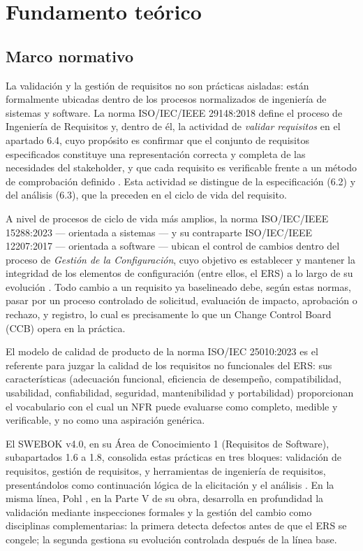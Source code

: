 \documentclass[11pt,a4paper]{article}
\begin{document}
\section{Fundamento teórico}
 
\subsection{Marco normativo}
La validación y la gestión de requisitos no son prácticas aisladas: están
formalmente ubicadas dentro de los procesos normalizados de ingeniería de
sistemas y software. La norma ISO/IEC/IEEE 29148:2018 define el proceso de
Ingeniería de Requisitos y, dentro de él, la actividad de \emph{validar
requisitos} en el apartado 6.4, cuyo propósito es confirmar que el conjunto
de requisitos especificados constituye una representación correcta y
completa de las necesidades del stakeholder, y que cada requisito es
verificable frente a un método de comprobación definido \cite{iso29148_2018}.
Esta actividad se distingue de la especificación (6.2) y del análisis (6.3),
que la preceden en el ciclo de vida del requisito.
 
A nivel de procesos de ciclo de vida más amplios, la norma
ISO/IEC/IEEE 15288:2023 --- orientada a sistemas --- y su contraparte
ISO/IEC/IEEE 12207:2017 --- orientada a software --- ubican el control de
cambios dentro del proceso de \emph{Gestión de la Configuración}, cuyo
objetivo es establecer y mantener la integridad de los elementos de
configuración (entre ellos, el ERS) a lo largo de su evolución
\cite{iso15288_2023, iso12207_2017}. Todo cambio a un requisito ya
baselineado debe, según estas normas, pasar por un proceso controlado de
solicitud, evaluación de impacto, aprobación o rechazo, y registro, lo cual
es precisamente lo que un Change Control Board (CCB) opera en la práctica.
 
El modelo de calidad de producto de la norma ISO/IEC 25010:2023
\cite{iso25010_2023} es el referente para juzgar la calidad de los
requisitos no funcionales del ERS: sus características (adecuación
funcional, eficiencia de desempeño, compatibilidad, usabilidad,
confiabilidad, seguridad, mantenibilidad y portabilidad) proporcionan el
vocabulario con el cual un NFR puede evaluarse como completo, medible y
verificable, y no como una aspiración genérica.
 
El SWEBOK v4.0, en su Área de Conocimiento 1 (Requisitos de Software),
subapartados 1.6 a 1.8, consolida estas prácticas en tres bloques:
validación de requisitos, gestión de requisitos, y herramientas de
ingeniería de requisitos, presentándolos como continuación lógica de la
elicitación y el análisis \cite{swebok_v4}. En la misma línea, Pohl
\cite{pohl2025}, en la Parte V de su obra, desarrolla en profundidad la
validación mediante inspecciones formales y la gestión del cambio como
disciplinas complementarias: la primera detecta defectos antes de que el
ERS se congele; la segunda gestiona su evolución controlada después de la
línea base.
 
\end{document}

